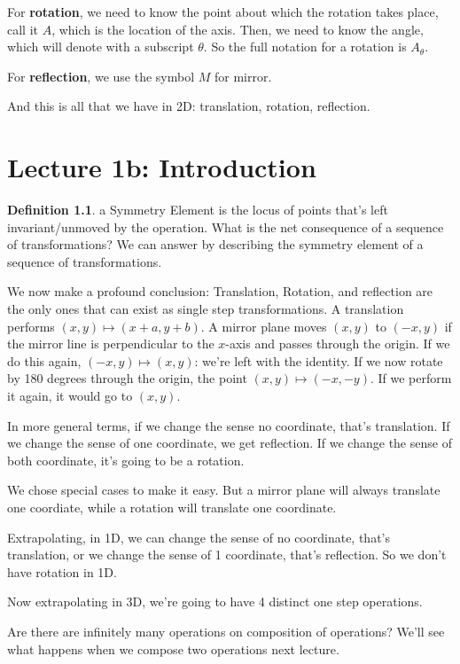 \documentclass{book}
\theoremstyle{definition}
\newtheorem{definition}[theorem]{Definition}
\begin{document}
For \textbf{rotation}, we need to know the point about which the rotation takes place,
call it $A$, which is the location of the axis. Then, we need to know the angle,
which will denote with a subscript $\theta$. So the full notation for a
rotation is $A_\theta$.

For \textbf{reflection}, we use the symbol $M$ for mirror. 

And this is all that we have in 2D: translation, rotation, reflection.

\chapter{Lecture 1b: Introduction}

\begin{definition}
a Symmetry Element is the locus of points that's left invariant/unmoved by the
operation.  What is the net consequence of a sequence of transformations? We
can answer by describing the symmetry element of a sequence of transformations.
\end{definition}


We now make a profound conclusion: Translation, Rotation, and reflection are the
only ones that can exist as single step transformations. A translation performs
$(x, y) \mapsto (x + a, y + b)$. A mirror plane moves $(x, y)$ to $(-x, y)$
if the mirror line is perpendicular to the $x$-axis and passes through the
origin. If we do this again, $(-x, y) \mapsto (x, y)$: we're left with the
identity. If we now rotate by 180 degrees through the origin, the point
$(x, y) \mapsto (-x, -y)$. If we perform it again, it would go to $(x, y)$.

In more general terms, if we change the sense no coordinate, that's translation.
If we change the sense of one coordinate, we get reflection. If we change the
sense of both coordinate, it's going to be a rotation.

We chose special cases to make it easy. But a mirror plane will always translate
one coordiate, while a rotation will translate one coordinate.


Extrapolating, in 1D, we can change the sense of no coordinate, that's
translation, or we change the sense of 1 coordinate, that's reflection. So we
don't have rotation in 1D.

Now extrapolating in 3D, we're going to have 4 distinct one step operations.

Are there are infinitely many operations on composition of operations? We'll see
what happens when we compose two operations next lecture.
\end{document}
